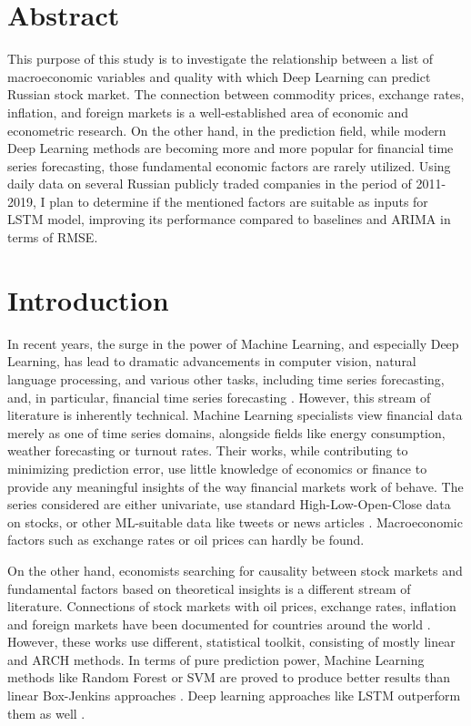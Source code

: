 \documentclass[stu]{apa7}
\begin{document}
%

\tableofcontents
\clearpage

\section{Abstract}

This purpose of this study is to investigate the relationship between a list of macroeconomic variables and quality with which Deep Learning can predict Russian stock market. The connection between commodity prices, exchange rates, inflation, and foreign markets is a well-established area of economic and econometric research. On the other hand, in the prediction field, while modern Deep Learning methods are becoming more and more popular for financial time series forecasting, those fundamental economic factors are rarely utilized.
Using daily data on several Russian publicly traded companies in the period of 2011-2019, I plan to determine if the mentioned factors are suitable as inputs for LSTM model, improving its performance compared to baselines and ARIMA in terms of RMSE.

\section{Introduction}


In recent years, the surge in the power of Machine Learning, and especially Deep Learning, has lead to dramatic advancements in computer vision, natural language processing, and various other tasks, including time series forecasting, and, in particular, financial time series forecasting \citep{lara-benitez_experimental_2021}.
However, this stream of literature is inherently technical.
Machine Learning specialists view financial data merely as one of time series domains, alongside fields like energy consumption, weather forecasting or turnout rates.
Their works, while contributing to minimizing prediction error, use little knowledge of economics or finance to provide any meaningful insights of the way financial markets work of behave.
The series considered are either univariate, use standard High-Low-Open-Close data on stocks, or other ML-suitable data like tweets or news articles \citep{sezer_financial_2019}.
Macroeconomic factors such as exchange rates or oil prices can hardly be found.

On the other hand, economists searching for causality between stock markets and fundamental factors based on theoretical insights is a different stream of literature. Connections of stock markets with oil prices, exchange rates, inflation and foreign markets have been documented for countries around the world \citep{verma_impact_2021}. However, these works use different, statistical toolkit, consisting of mostly linear and ARCH methods. In terms of pure prediction power, Machine Learning methods like Random Forest or SVM are proved to produce better results than linear Box-Jenkins approaches \citep{kumar_forecasting_2006}. Deep learning approaches like LSTM outperform them as well \citep{siami-namini_forecasting_2018}.
\end{document}
